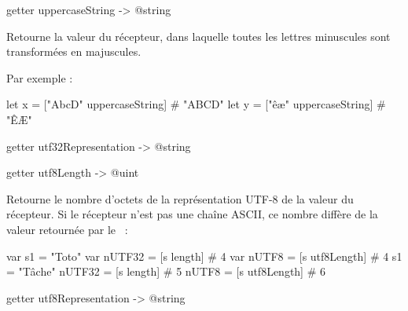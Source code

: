 
\begin{galgasbox}
getter uppercaseString -> @string
\end{galgasbox}

Retourne la valeur du récepteur, dans laquelle toutes les lettres minuscules sont transformées en majuscules.

Par exemple :
\begin{galgas}
let x = ["AbcD" uppercaseString] # "ABCD"
let y = ["êæ" uppercaseString] # "ÊÆ"
\end{galgas}















\begin{galgasbox}
getter utf32Representation -> @string
\end{galgasbox}
















\begin{galgasbox}
getter utf8Length -> @uint
\end{galgasbox}

Retourne le nombre d'octets de la représentation UTF-8 de la valeur du récepteur. Si le récepteur n'est pas une chaîne ASCII, ce nombre diffère de la valeur retournée par le ~:

\begin{galgas}
 var s1 = "Toto"
 var nUTF32 = [s length] # 4
 var nUTF8  = [s utf8Length] # 4
 s1 = "Tâche"
 nUTF32 = [s length] # 5
 nUTF8  = [s utf8Length] # 6
\end{galgas}









\begin{galgasbox}
getter utf8Representation -> @string
\end{galgasbox}


